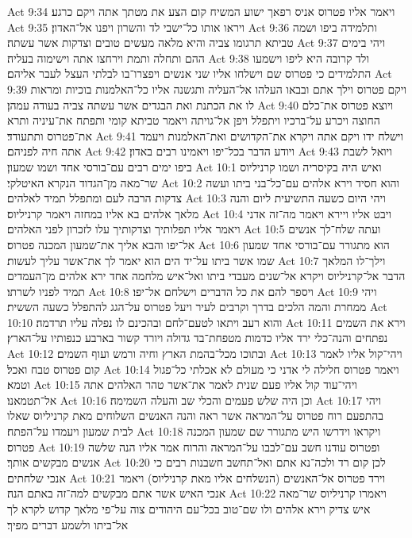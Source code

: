 Act 9:34  ויאמר אליו פטרוס אניס רפאך ישוע המשיח קום הצע את מטתך אתה ויקם כרגע׃
Act 9:35  ויראו אותו כל־ישבי לד והשרון ויפנו אל־האדון׃
Act 9:36  ותלמידה ביפו ושמה טביתא תרגומו צביה והיא מלאה מעשים טובים וצדקות אשר עשתה׃
Act 9:37  ויהי בימים ההם ותחלה ותמת וירחצו אתה וישימוה בעליה׃
Act 9:38  ולד קרובה היא ליפו וישמעו התלמידים כי פטרוס שם וישלחו אליו שני אנשים ויפצרו־בו לבלתי העצל לעבר אליהם׃
Act 9:39  ויקם פטרוס וילך אתם ובבאו העלהו אל־העליה ותגשנה אליו כל־האלמנות בוכיות ומראות לו את הכתנת ואת הבגדים אשר עשתה צביה בעודה עמהן׃
Act 9:40  ויוצא פטרוס את־כלם החוצה ויכרע על־ברכיו ויתפלל ויפן אל־גויתה ויאמר טביתא קומי ותפתח את־עיניה ותרא את־פטרוס ותתעודד׃
Act 9:41  וישלח ידו ויקם אתה ויקרא את־הקדושים ואת־האלמנות ויעמד אתה חיה לפניהם׃
Act 9:42  ויודע הדבר בכל־יפו ויאמינו רבים באדון׃
Act 9:43  ויואל לשבת ביפו ימים רבים עם־בורסי אחד ושמו שמעון׃
Act 10:1  ואיש היה בקיסריה ושמו קרניליוס שר־מאה מן־הגדוד הנקרא האיטלקי׃
Act 10:2  והוא חסיד וירא אלהים עם־כל־בני ביתו ועשה צדקות הרבה לעם ומתפלל תמיד לאלהים׃
Act 10:3  ויהי היום כשעה התשיעית ליום והנה מלאך אלהים בא אליו במחזה ויאמר קרניליוס׃
Act 10:4  ויבט אליו ויירא ויאמר מה־זה אדני ויאמר אליו תפלותיך וצדקותיך עלו לזכרון לפני האלהים׃
Act 10:5  ועתה שלח־לך אנשים אל־יפו והבא אליך את־שמעון המכנה פטרוס׃
Act 10:6  הוא מתגורר עם־בורסי אחד שמעון שמו אשר ביתו על־יד הים הוא יאמר לך את־אשר עליך לעשות׃
Act 10:7  וילך־לו המלאך הדבר אל־קרניליוס ויקרא אל־שנים מעבדי ביתו ואל־איש מלחמה אחד ירא אלהים מן־העמדים תמיד לפניו לשרתו׃
Act 10:8  ויספר להם את כל הדברים וישלחם אל־יפו׃
Act 10:9  ויהי ממחרת והמה הלכים בדרך וקרבים לעיר ויעל פטרוס על־הגג להתפלל כשעה הששית׃
Act 10:10  והוא רעב ויתאו לטעם־לחם ובהכינם לו נפלה עליו תרדמה׃
Act 10:11  וירא את השמים נפתחים והנה־כלי ירד אליו כדמות מטפחת־בד גדולה ויורד קשור בארבע כנפותיו על־הארץ׃
Act 10:12  ובתוכו מכל־בהמת הארץ וחיה ורמש ועוף השמים׃
Act 10:13  ויהי־קול אליו לאמר קום פטרוס טבח ואכל׃
Act 10:14  ויאמר פטרוס חלילה לי אדני כי מעולם לא אכלתי כל־פגול וטמא׃
Act 10:15  ויהי־עוד קול אליו פעם שנית לאמר את־אשר טהר האלהים אתה אל־תטמאנו׃
Act 10:16  וכן היה שלש פעמים והכלי שב והעלה השמימה׃
Act 10:17  ויהי בהתפעם רוח פטרוס על־המראה אשר ראה והנה האנשים השלוחים מאת קרניליוס שאלו לבית שמעון ויעמדו על־הפתח׃
Act 10:18  ויקראו וידרשו היש מתגורר שם שמעון המכנה פטרוס׃
Act 10:19  ופטרוס עודנו חשב עם־לבבו על־המראה והרוח אמר אליו הנה שלשה אנשים מבקשים אותך׃
Act 10:20  לכן קום רד ולכה־נא אתם ואל־תחשב חשבנות רבים כי אנכי שלחתים׃
Act 10:21  וירד פטרוס אל־האנשים (הנשלחים אליו מאת קרניליוס) ויאמר אנכי האיש אשר אתם מבקשים למה־זה באתם הנה׃
Act 10:22  ויאמרו קרניליוס שר־מאה איש צדיק וירא אלהים ולו שם־טוב בכל־עם היהודים צוה על־פי מלאך קדוש לקרא לך אל־ביתו ולשמע דברים מפיך׃
